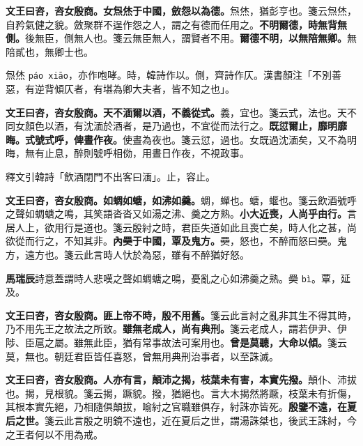 \textbf{文王曰咨，咨女殷商。女炰烋于中國，斂怨以為德。}{\footnotesize 炰烋，猶彭亨也。箋云炰烋，自矜氣健之貌。斂聚群不逞作怨之人，謂之有德而任用之。}\textbf{不明爾德，時無背無側。}{\footnotesize 後無臣，側無人也。箋云無臣無人，謂賢者不用。}\textbf{爾德不明，以無陪無卿。}{\footnotesize 無陪貳也，無卿士也。}

\begin{quoting}炰烋 \texttt{páo xiāo}，亦作咆哮。時，韓詩作以。側，齊詩作仄。漢書顏注「不別善惡，有逆背傾仄者，有堪為卿大夫者，皆不知之也」。\end{quoting}

\textbf{文王曰咨，咨女殷商。天不湎爾以酒，不義從式。}{\footnotesize 義，宜也。箋云式，法也。天不同女顏色以酒，有沈湎於酒者，是乃過也，不宜從而法行之。}\textbf{既愆爾止，靡明靡晦。式號式呼，俾晝作夜。}{\footnotesize 使晝為夜也。箋云愆，過也。女既過沈湎矣，又不為明晦，無有止息，醉則號呼相俲，用晝日作夜，不視政事。}

\begin{quoting}釋文引韓詩「飲酒閉門不出客曰湎」。止，容止。\end{quoting}

\textbf{文王曰咨，咨女殷商。如蜩如螗，如沸如羹。}{\footnotesize 蜩，蟬也。螗，蝘也。箋云飲酒號呼之聲如蜩螗之鳴，其笑語沓沓又如湯之沸、羹之方熟。}\textbf{小大近喪，人尚乎由行。}{\footnotesize 言居人上，欲用行是道也。箋云殷紂之時，君臣失道如此且喪亡矣，時人化之甚，尚欲從而行之，不知其非。}\textbf{內奰于中國，覃及鬼方。}{\footnotesize 奰，怒也，不醉而怒曰奰。鬼方，遠方也。箋云此言時人忕於為惡，雖有不醉猶好怒。}

\begin{quoting}\textbf{馬瑞辰}詩意蓋謂時人悲嘆之聲如蜩螗之鳴，憂亂之心如沸羹之熟。奰 \texttt{bì}。覃，延及。\end{quoting}

\textbf{文王曰咨，咨女殷商。匪上帝不時，殷不用舊。}{\footnotesize 箋云此言紂之亂非其生不得其時，乃不用先王之故法之所致。}\textbf{雖無老成人，尚有典刑。}{\footnotesize 箋云老成人，謂若伊尹、伊陟、臣扈之屬。雖無此臣，猶有常事故法可案用也。}\textbf{曾是莫聽，大命以傾。}{\footnotesize 箋云莫，無也。朝廷君臣皆任喜怒，曾無用典刑治事者，以至誅滅。}

\textbf{文王曰咨，咨女殷商。人亦有言，顛沛之揭，枝葉未有害，本實先撥。}{\footnotesize 顛仆、沛拔也。揭，見根貌。箋云揭，蹶貌。撥，猶絕也。言大木揭然將蹶，枝葉未有折傷，其根本實先絕，乃相隨俱顛拔，喻紂之官職雖俱存，紂誅亦皆死。}\textbf{殷鑒不遠，在夏后之世。}{\footnotesize 箋云此言殷之明鏡不遠也，近在夏后之世，謂湯誅桀也，後武王誅紂，今之王者何以不用為戒。}

